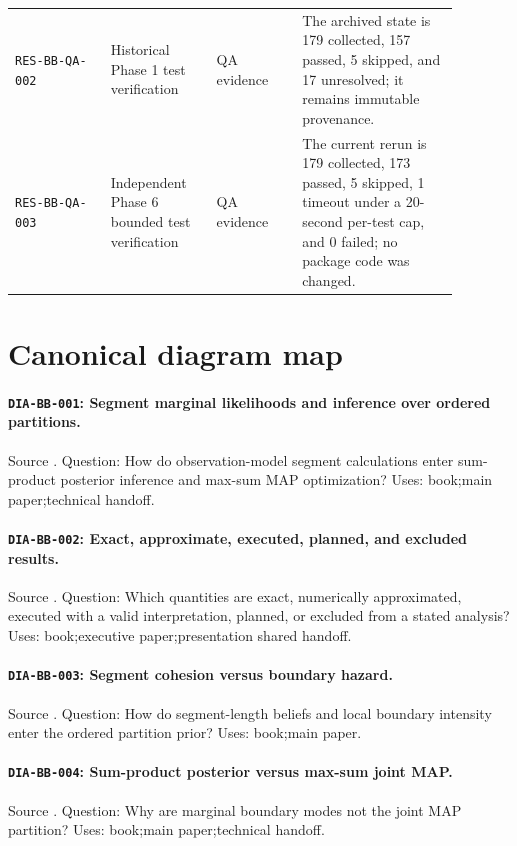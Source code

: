 \begin{longtable}{@{}p{0.19\linewidth}p{0.21\linewidth}p{0.17\linewidth}p{0.31\linewidth}@{}}
\texttt{RES-BB-QA-002} & Historical Phase 1 test verification & QA evidence & The archived state is 179 collected, 157 passed, 5 skipped, and 17 unresolved; it remains immutable provenance. \\
\texttt{RES-BB-QA-003} & Independent Phase 6 bounded test verification & QA evidence & The current rerun is 179 collected, 173 passed, 5 skipped, 1 timeout under a 20-second per-test cap, and 0 failed; no package code was changed. \\

\bottomrule
\end{longtable}
\normalsize

\section{Canonical diagram map}
\paragraph{\texttt{DIA-BB-001}: Segment marginal likelihoods and inference over ordered partitions.} Source . Question: How do observation-model segment calculations enter sum-product posterior inference and max-sum MAP optimization? Uses: book;main paper;technical handoff.
\paragraph{\texttt{DIA-BB-002}: Exact, approximate, executed, planned, and excluded results.} Source . Question: Which quantities are exact, numerically approximated, executed with a valid interpretation, planned, or excluded from a stated analysis? Uses: book;executive paper;presentation shared handoff.
\paragraph{\texttt{DIA-BB-003}: Segment cohesion versus boundary hazard.} Source . Question: How do segment-length beliefs and local boundary intensity enter the ordered partition prior? Uses: book;main paper.
\paragraph{\texttt{DIA-BB-004}: Sum-product posterior versus max-sum joint MAP.} Source . Question: Why are marginal boundary modes not the joint MAP partition? Uses: book;main paper;technical handoff.
